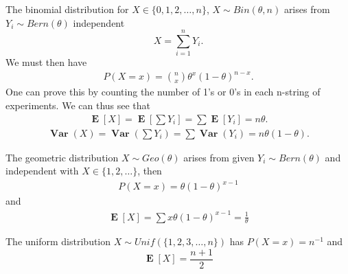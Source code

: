 \documentclass{article}
\theoremstyle{problemstyle}
\DeclareMathOperator{\Var}{\mathbf{Var}}
\DeclareMathOperator{\E}{\mathbf{E}}
\begin{document}
\begin{example}[Binomial]
  The binomial distribution for $ X \in \{0,1,2,\dots,n\} $, $ X\sim Bin(\theta, n) $ arises from $ Y_i\sim Bern(\theta) $ independent
  \[
    X = \sum_{i=1}^n Y_i.
  \]
  We must then have
  \begin{align*}
    P(X=x) = {n\choose x} \theta^x (1-\theta)^{n-x}.
  \end{align*}
  One can prove this by counting the number of 1's or 0's in each n-string of experiments. We can thus see that
  \begin{align*}
    \E[X] = \E\left[\sum Y_i\right] = \sum \E[Y_i] = n\theta.
  \end{align*}
  \begin{align}
    \Var(X) = \Var(\sum Y_i) = \sum \Var(Y_i) = n\theta(1-\theta).
  \end{align}
\end{example}

\begin{example}[Geometric]
  The geometric distribution $ X\sim Geo(\theta) $ arises from given $ Y_i \sim Bern(\theta) $ and independent with $ X\in \{1,2,\dots\} $, then
  \begin{align}
    P(X=x) = \theta(1-\theta)^{x-1}
  \end{align}
  and 
  \begin{align*}
    \E[X] = \sum x \theta(1-\theta)^{x-1} = \frac{1}{\theta}
  \end{align*}
  
\end{example}

\begin{example}[Uniform]
  The uniform distribution $ X\sim Unif(\{1,2,3,\dots, n\}) $ has $ P(X=x) = n^{-1} $ and
  \[
    \E[X] = \displaystyle\frac{n+1}{2}
  \]
\end{example}


\end{document}
